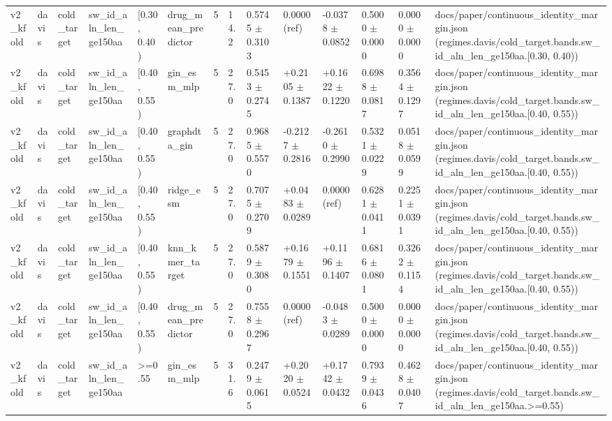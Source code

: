 \begin{table}[htbp]
\begin{tabular}{llllllllllllll}
v2\_kfold & davis & cold\_target & sw\_id\_aln\_len\_ge150aa & [0.30, 0.40) & drug\_mean\_predictor & 5 & 14.2 & 0.5745 $\pm$ 0.3103 & 0.0000 (ref) & -0.0378 $\pm$ 0.0852 & 0.5000 $\pm$ 0.0000 & 0.0000 $\pm$ 0.0000 & docs/paper/continuous\_identity\_margin.json (regimes.davis/cold\_target.bands.sw\_id\_aln\_len\_ge150aa.[0.30, 0.40)) \\
v2\_kfold & davis & cold\_target & sw\_id\_aln\_len\_ge150aa & [0.40, 0.55) & gin\_esm\_mlp & 5 & 27.0 & 0.5453 $\pm$ 0.2745 & +0.2105 $\pm$ 0.1387 & +0.1622 $\pm$ 0.1220 & 0.6988 $\pm$ 0.0817 & 0.3564 $\pm$ 0.1297 & docs/paper/continuous\_identity\_margin.json (regimes.davis/cold\_target.bands.sw\_id\_aln\_len\_ge150aa.[0.40, 0.55)) \\
v2\_kfold & davis & cold\_target & sw\_id\_aln\_len\_ge150aa & [0.40, 0.55) & graphdta\_gin & 5 & 27.0 & 0.9685 $\pm$ 0.5570 & -0.2127 $\pm$ 0.2816 & -0.2610 $\pm$ 0.2990 & 0.5321 $\pm$ 0.0229 & 0.0518 $\pm$ 0.0599 & docs/paper/continuous\_identity\_margin.json (regimes.davis/cold\_target.bands.sw\_id\_aln\_len\_ge150aa.[0.40, 0.55)) \\
v2\_kfold & davis & cold\_target & sw\_id\_aln\_len\_ge150aa & [0.40, 0.55) & ridge\_esm & 5 & 27.0 & 0.7075 $\pm$ 0.2709 & +0.0483 $\pm$ 0.0289 & 0.0000 (ref) & 0.6281 $\pm$ 0.0411 & 0.2251 $\pm$ 0.0391 & docs/paper/continuous\_identity\_margin.json (regimes.davis/cold\_target.bands.sw\_id\_aln\_len\_ge150aa.[0.40, 0.55)) \\
v2\_kfold & davis & cold\_target & sw\_id\_aln\_len\_ge150aa & [0.40, 0.55) & knn\_kmer\_target & 5 & 27.0 & 0.5879 $\pm$ 0.3080 & +0.1679 $\pm$ 0.1551 & +0.1196 $\pm$ 0.1407 & 0.6816 $\pm$ 0.0801 & 0.3262 $\pm$ 0.1154 & docs/paper/continuous\_identity\_margin.json (regimes.davis/cold\_target.bands.sw\_id\_aln\_len\_ge150aa.[0.40, 0.55)) \\
v2\_kfold & davis & cold\_target & sw\_id\_aln\_len\_ge150aa & [0.40, 0.55) & drug\_mean\_predictor & 5 & 27.0 & 0.7558 $\pm$ 0.2967 & 0.0000 (ref) & -0.0483 $\pm$ 0.0289 & 0.5000 $\pm$ 0.0000 & 0.0000 $\pm$ 0.0000 & docs/paper/continuous\_identity\_margin.json (regimes.davis/cold\_target.bands.sw\_id\_aln\_len\_ge150aa.[0.40, 0.55)) \\
v2\_kfold & davis & cold\_target & sw\_id\_aln\_len\_ge150aa & >=0.55 & gin\_esm\_mlp & 5 & 31.6 & 0.2479 $\pm$ 0.0615 & +0.2020 $\pm$ 0.0524 & +0.1742 $\pm$ 0.0432 & 0.7939 $\pm$ 0.0436 & 0.4628 $\pm$ 0.0407 & docs/paper/continuous\_identity\_margin.json (regimes.davis/cold\_target.bands.sw\_id\_aln\_len\_ge150aa.>=0.55) \\

\end{tabular}
\end{table}
